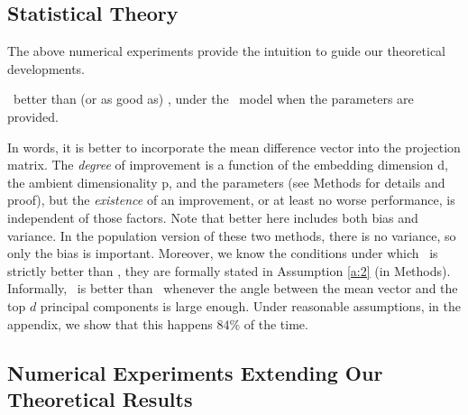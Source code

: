 \documentclass[10pt]{article}
\begin{document}
\subsection*{Statistical Theory}

The above numerical experiments provide the intuition to guide our theoretical developments.
\begin{thm} \label{t:LDA}
\Lol~better than (or as good as) \Pca, under the \Lda~model when the parameters are provided.
\end{thm}
In words, it is better to incorporate the mean difference vector into the projection matrix.  The \emph{degree} of improvement is a function of the embedding dimension d, the ambient dimensionality p, and the parameters (see Methods for details and proof), but the \emph{existence} of an improvement, or at least no worse performance, is independent of those factors.  Note that better here includes both bias and variance.  In the population version of these two methods, there is no variance, so only the bias is important.  Moreover, we know the conditions under which \Lol~is strictly better than \Pca, they are formally stated in Assumption \ref{a:2} (in Methods).  Informally, \Lol~is better than \Pca~whenever the angle between the mean vector and the top $d$ principal components is large enough. Under reasonable assumptions, in the appendix, we show that this happens $84\%$ of the time.



\subsection*{Numerical Experiments Extending Our Theoretical Results}

\end{document}
